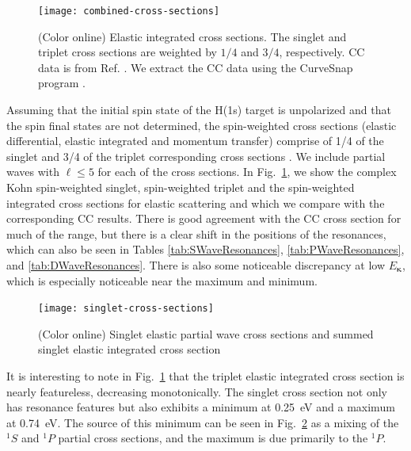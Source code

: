 \documentclass[preprint,showpacs,showkeys,preprintnumbers,amsmath,amssymb,longbibliography,pra,aps]{revtex4-1}
\begin{document}
{\begin{figure}[H]
	\centering
	\texttt{[image: combined-cross-sections]}
	\caption{(Color online) Elastic integrated cross sections. The singlet and
triplet cross sections are weighted by $1/4$ and $3/4$,
respectively. CC data is from Ref. \cite{Walters2004}.
We extract the CC data using the
CurveSnap program \cite{CurveSnap}.}
	\label{fig:combined-cross-sections}
\end{figure}

Assuming that the initial spin state of the H(1s) target is unpolarized and 
that the spin final states are not determined, the spin-weighted cross 
sections (elastic differential, elastic integrated and momentum transfer) 
comprise of 1/4 of the singlet and 3/4 of the triplet corresponding cross 
sections \cite{Blackwood2002,Joachain1979,Ray1996}.
We include partial waves with $\ell \leq 5$ for each of the cross sections. 
In Fig.~\ref{fig:combined-cross-sections}, we show the complex Kohn
spin-weighted singlet, spin-weighted triplet and the spin-weighted integrated 
cross sections for elastic scattering and which we compare with the
corresponding CC results.
There is good agreement with the 
CC cross section for much of the range, but there is a 
clear shift in the positions of the resonances, which can also be seen in 
Tables \ref{tab:SWaveResonances}, \ref{tab:PWaveResonances}, and
\ref{tab:DWaveResonances}. There is also some noticeable discrepancy at low
$E_{\bm \kappa}$, which is especially noticeable near the maximum and minimum.

\begin{figure}[H]
	\centering
	\texttt{[image: singlet-cross-sections]}
	\caption{(Color online) Singlet elastic partial wave cross
sections and summed singlet elastic integrated cross section}
	\label{fig:singlet-cross-sections}
\end{figure}

It is interesting to note in Fig.~\ref{fig:combined-cross-sections} that the
triplet elastic integrated cross section is nearly featureless, decreasing
monotonically. The singlet cross section not only has resonance
features but also exhibits a minimum at 0.25~eV and a maximum at 0.74~eV.
The source of this minimum can be seen in
Fig.~\ref{fig:singlet-cross-sections} as a mixing of the $^1S$ and $^1P$
partial cross sections, and the maximum is due primarily to the $^1P$.

}
\end{document}
